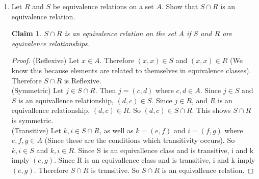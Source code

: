 \documentclass[11pt]{letter}
\newtheorem{claim}{Claim}
\theoremstyle{definition}
\begin{document}
\begin{description}
\begin{enumerate}
			      \item Let $R$ and $S$ be equivalence relations on a set $A$. Show that $S\cap R$ is an equivalence relation.
                                \begin{claim}
                                  $S\cap R$ is an equivalence relation on the set $A$ if $S$ and $R$ are equivalence relationships.                            
                                \end{claim}
                                \begin{proof}
                                  (Reflexive) Let $x\in A$. Therefore $(x,x)\in S$ and $(x,x)\in R$ (We know this because elements are related to themselves in equivalence classes). Therefore $S\cap R$ is Reflexive.\\
                                  (Symmetric) Let $j\in S\cap R$. Then $j=(c,d)$ where $c,d\in A$. Since $j\in S$ and $S$ is an equivallence relationship, $(d,c)\in S$. Since $j\in R$, and $R$ is an equivallence relationship, $(d,c)\in R$. So $(d,c)\in S\cap R$. This shows $S\cap R$ is symmetric.\\
                                  (Transitive) Let $k, i\in S\cap R$, as well as $k=(e,f)$ and $i=(f,g)$ where $e,f,g\in A$ (Since these are the conditions which transitivity occurs). So $k,i\in S$ and $k,i\in R$. Since S is an equivallence class and is transitive, i and k imply $(e,g)$. Since R is an equivallence class and is transitive, i and k imply $(e,g)$. Therefore $S\cap R$ is transitive. So $S\cap R$ is an equivallence relation. 
                                \end{proof}                                
                                

\end{enumerate}
\end{description}
\end{document}
